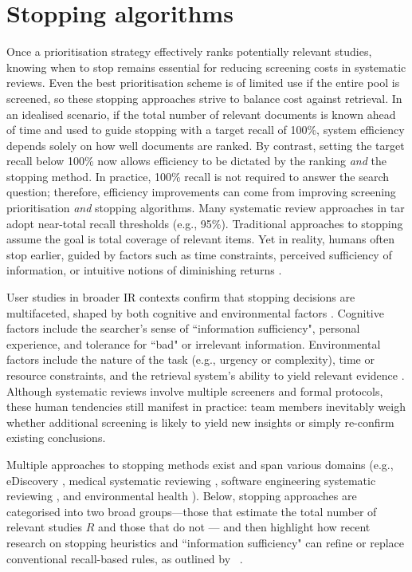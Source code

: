 \documentclass[10pt,oneside]{book}
\begin{document}
\section{Stopping algorithms}\label{sec:Stopping_algorithms}

Once a prioritisation strategy effectively ranks potentially relevant studies, knowing when to stop remains essential for reducing screening costs in systematic reviews. Even the best prioritisation scheme is of limited use if the entire pool is screened, so these stopping approaches strive to balance cost against retrieval. In an idealised scenario, if the total number of relevant documents is known ahead of time and used to guide stopping with a target recall of 100\%, system efficiency depends solely on how well documents are ranked. By contrast, setting the target recall below 100\% now allows efficiency to be dictated by the ranking \emph{and} the stopping method. In practice, 100\% recall is not required to answer the search question; therefore, efficiency improvements can come from improving screening prioritisation \emph{and} stopping algorithms. Many systematic review approaches in \gls*{tar} adopt near-total recall thresholds (e.g., 95\%). Traditional approaches to stopping assume the goal is total coverage of relevant items. Yet in reality, humans often stop earlier, guided by factors such as time constraints, perceived sufficiency of information, or intuitive notions of diminishing returns \cite{ilani_analysis_2024, browne_cognitive_2007, wu_online_2014}.

User studies in broader IR contexts confirm that stopping decisions are multifaceted, shaped by both cognitive and environmental factors \cite{ilani_analysis_2024}. Cognitive factors include the searcher’s sense of ``information sufficiency", personal experience, and tolerance for ``bad" or irrelevant information. Environmental factors include the nature of the task (e.g., urgency or complexity), time or resource constraints, and the retrieval system's ability to yield relevant evidence \cite{prabha_what_2007}. Although systematic reviews involve multiple screeners and formal protocols, these human tendencies still manifest in practice: team members inevitably weigh whether additional screening is likely to yield new insights or simply re-confirm existing conclusions.

Multiple approaches to stopping methods exist and span various domains (e.g., eDiscovery \cite{yang_heuristic_2021, yang_minimizing_2021}, medical systematic reviewing \cite{shemilt_pinpointing_2014}, software engineering systematic reviewing \cite{yu_fast2_2019}, and environmental health \cite{howard_swift-active_2020}). Below, stopping approaches are categorised into two broad groups—those that estimate the total number of relevant studies $R$ and those that do not — and then highlight how recent research on stopping heuristics and ``information sufficiency" can refine or replace conventional recall-based rules, as outlined by ~\cite{stevenson_stopping_2023}.
\end{document}
